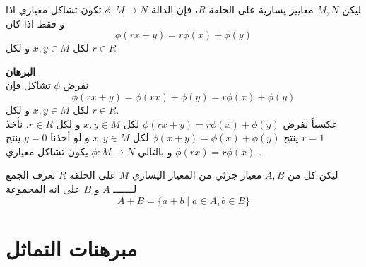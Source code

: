 \begin{theorem}
	ليكن $M,N$ معايير يسارية على الحلقة $R$، فإن الدالة $\phi:M\to N$ تكون تشاكل معياري اذا و فقط اذا كان
	\[
	\phi(rx + y) = r\phi(x) + \phi(y)
	\]
	لكل $x,y\in M$ و لكل $r\in R$
\end{theorem}
\noindent
\textbf{البرهان}\\
\noindent
نفرض $\phi$ تشاكل فإن
\[
\phi(rx+y) = \phi(rx) + \phi(y) = r\phi(x) + \phi(y)
\]
لكل $x,y \in M$ و لكل $r\in R$.\\
عكسياً نفرض $\phi(rx+y)=r\phi(x)+\phi(y)$ لكل $x,y\in M$ و لكل $r\in R$. نأخذ $r=1$ ينتج $\phi(x+y) = \phi(x)+\phi(y)$ لكل $x,y\in M$ و لو أخذنا $y=0$ ينتج $\phi(rx)=r\phi(x)$ و بالتالي $\phi : M \to N$ يكون تشاكل معياري . \qedsymbol

\begin{definition}
	ليكن كل من $A,B$ معيار جزئي من المعيار اليساري $M$ على الحلقة $R$ نعرف الجمع لـــــــ $A$ و $B$ على انه المجموعة
	\[
	A+B = \{a+b \mid a\in A, b\in B\}
	\]
\end{definition}
	
\section{مبرهنات التماثل}
	
